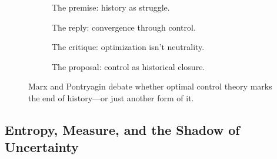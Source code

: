 \begin{figure}[H]
\centering

\begin{subfigure}[t]{0.45\textwidth}
\centering
{}
\caption*{The premise: history as struggle.}
\end{subfigure}
\hfill
\begin{subfigure}[t]{0.45\textwidth}
\centering
{}
\caption*{The reply: convergence through control.}
\end{subfigure}

\vspace{1em}

\begin{subfigure}[t]{0.45\textwidth}
\centering
{}
\caption*{The critique: optimization isn’t neutrality.}
\end{subfigure}
\hfill
\begin{subfigure}[t]{0.45\textwidth}
\centering
{}
\caption*{The proposal: control as historical closure.}
\end{subfigure}

\caption{Marx and Pontryagin debate whether optimal control theory marks the end of history—or just another form of it.}
\end{figure}



\subsection{Entropy, Measure, and the Shadow of Uncertainty}

